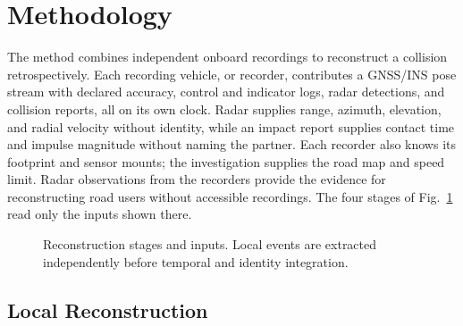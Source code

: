 \section{Methodology}
\label{sec:methodology}

The method combines independent onboard recordings to reconstruct a collision
retrospectively. Each recording vehicle, or recorder, contributes a GNSS/INS
pose stream with declared accuracy, control and indicator logs, radar
detections, and collision reports, all on its own clock. Radar supplies
range, azimuth, elevation, and radial velocity without identity, while an
impact report supplies contact time and impulse magnitude without naming
the partner. Each recorder also knows its footprint and sensor mounts; the
investigation supplies the road map and speed limit. Radar observations
from the recorders provide the evidence for reconstructing road users
without accessible recordings. The four stages of
Fig.~\ref{fig:pipeline} read only the inputs shown there.

\begin{figure}[!t]
  \centering
  
  \caption{Reconstruction stages and inputs. Local events are extracted
  independently before temporal and identity integration.}
  \label{fig:pipeline}
\end{figure}


\subsection{Local Reconstruction}
\label{subsec:local-reconstruction}

